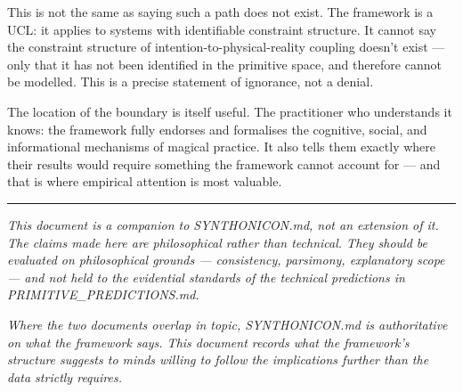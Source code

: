 \documentclass[12pt,a4paper]{article}
\begin{document}
This is not the same as saying such a path does not exist. The framework is a UCL: it applies to systems with identifiable constraint structure. It cannot say the constraint structure of intention-to-physical-reality coupling doesn't exist --- only that it has not been identified in the primitive space, and therefore cannot be modelled. This is a precise statement of ignorance, not a denial.

The location of the boundary is itself useful. The practitioner who understands it knows: the framework fully endorses and formalises the cognitive, social, and informational mechanisms of magical practice. It also tells them exactly where their results would require something the framework cannot account for --- and that is where empirical attention is most valuable.

\begin{center}
\rule{0.5\textwidth}{0.4pt}
\end{center}

\emph{This document is a companion to SYNTHONICON.md, not an extension of it. The claims made here are philosophical rather than technical. They should be evaluated on philosophical grounds --- consistency, parsimony, explanatory scope --- and not held to the evidential standards of the technical predictions in PRIMITIVE\_PREDICTIONS.md.}

\emph{Where the two documents overlap in topic, SYNTHONICON.md is authoritative on what the framework says. This document records what the framework's structure suggests to minds willing to follow the implications further than the data strictly requires.}
\end{document}
